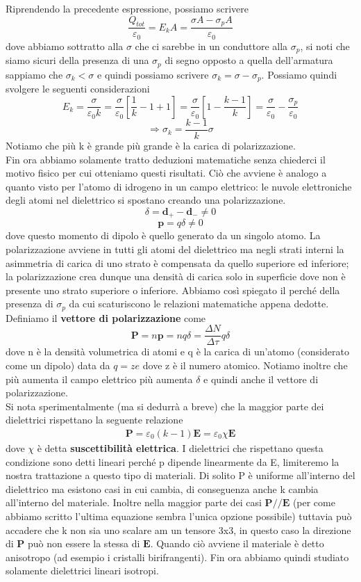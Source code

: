 \documentclass[
10pt, %
a4paper, %
oneside, %
headinclude,footinclude, %
BCOR5mm, %
]{scrartcl}
\begin{document}
Riprendendo la precedente espressione, possiamo scrivere
 \[\frac{Q_{tot}}{\varepsilon_0} = E_k A = \frac{\sigma A - \sigma_p A}{\varepsilon_0}\]
dove abbiamo sottratto alla $\sigma$ che ci sarebbe in un conduttore alla $\sigma_p$, si noti che siamo sicuri della presenza di una $\sigma_p$ di segno opposto a quella dell'armatura  sappiamo che \(\sigma_k<\sigma\) e quindi possiamo scrivere \(\sigma_k = \sigma -\sigma_p\). Possiamo quindi svolgere le seguenti considerazioni
\[E_k = \frac{\sigma }{\varepsilon_0 k} = \frac{\sigma}{\varepsilon_0}\left[\frac{1}{k}-1+1\right] = \frac{\sigma}{\varepsilon_0}\left[1-\frac{k-1}{k}\right] = \frac{\sigma}{\varepsilon_0}-\frac{\sigma_p}{\varepsilon_0}\]
\[\Rightarrow \sigma_k = \frac{k-1}{k}\sigma\]
Notiamo che più k è grande più grande è la carica di polarizzazione.\\
Fin ora abbiamo solamente tratto deduzioni matematiche senza chiederci il motivo fisico per cui otteniamo questi risultati. Ciò che avviene è analogo a quanto visto per l'atomo di idrogeno in un campo elettrico: le nuvole elettroniche degli atomi nel dielettrico si spostano creando una polarizzazione. 
\[\delta = \mathbf{d}_+ -\mathbf{d}_- \neq 0\]
\[\mathbf{p} = q\delta\neq 0\]
dove questo momento di dipolo è quello generato da un singolo atomo. La polarizzazione avviene in tutti gli atomi del dielettrico ma negli strati interni la asimmetria di carica di uno strato è compensata da quello superiore ed inferiore; la polarizzazione crea dunque una densità di carica solo in superficie dove non è presente uno strato superiore o inferiore. Abbiamo così spiegato il perché della presenza di \(\sigma_p\) da cui scaturiscono le relazioni matematiche appena dedotte. Definiamo il \textbf{vettore di polarizzazione} come
\[\mathbf{P} = n\mathbf{p} = nq\delta = \frac{\Delta N}{\Delta \tau} q \delta \]  
dove n è la densità volumetrica di atomi e q è la carica di un'atomo (considerato come un dipolo) data da \(q = ze\) dove z è il numero atomico. Notiamo inoltre che più aumenta il campo elettrico più aumenta $\delta$ e quindi anche il vettore di polarizzazione.\\
Si nota sperimentalmente (ma si dedurrà a breve) che la maggior parte dei dielettrici rispettano la seguente relazione
\begin{align}\label{eq:polarizzazione_lineare}
	\mathbf{P} = \varepsilon_0(k-1)\mathbf{E} = \varepsilon_0 \chi \mathbf{E}
\end{align}
dove $\chi$ è detta \textbf{suscettibilità elettrica}. I dielettrici che rispettano questa condizione sono detti lineari perché p dipende linearmente da E, limiteremo la nostra trattazione a questo tipo di materiali. Di solito P è uniforme all'interno del dielettrico ma esistono casi in cui cambia, di conseguenza anche k cambia all'interno del materiale. Inoltre nella maggior parte dei casi \(\mathbf{P} // \mathbf{E}\) (per come abbiamo scritto l'ultima equazione sembra l'unica opzione possibile) tuttavia può accadere che k non sia uno scalare am un tensore 3x3, in questo caso la direzione di $\mathbf{P}$ può non essere la stessa di $\mathbf{E}$. Quando ciò avviene il materiale è detto anisotropo (ad esempio i cristalli birifrangenti). Fin ora abbiamo quindi studiato solamente dielettrici lineari isotropi.
\end{document}
